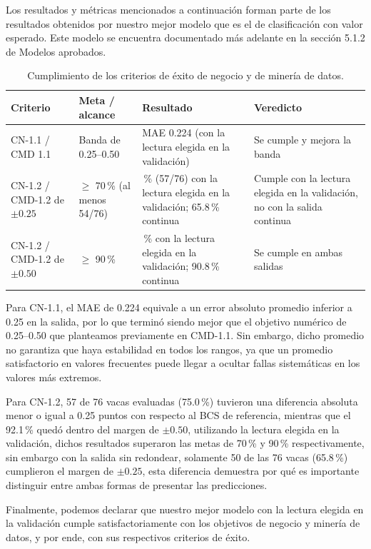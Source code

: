 Los resultados y métricas mencionados a continuación forman parte de los resultados obtenidos por nuestro mejor modelo que es el de clasificación con valor esperado. Este modelo se encuentra documentado más adelante en la sección 5.1.2 de Modelos aprobados.

\begin{table}[H]
  \centering
  \small
  \caption{Cumplimiento de los criterios de éxito de negocio y de minería de datos.}
  \label{tab:criterios}
  \begin{tabularx}{\textwidth}{>{\raggedright\arraybackslash}p{}>{\raggedright\arraybackslash}p{}>{\raggedright\arraybackslash}X>{\raggedright\arraybackslash}p{}}
    \toprule
    Criterio & Meta / alcance & Resultado & Veredicto \\
    \midrule
    CN-1.1 / CMD 1.1 & Banda de 0.25--0.50 & MAE 0.224 (con la lectura elegida en la validación) & Se cumple y mejora la banda \\
    \addlinespace
    CN-1.2 / CMD-1.2 de $\pm0.25$ & $\geq$ 70\,\% (al menos 54/76) & 75.0\,\% (57/76) con la lectura elegida en la validación; 65.8\,\% continua & Cumple con la lectura elegida en la validación, no con la salida continua \\
    \addlinespace
    CN-1.2 / CMD-1.2 de $\pm0.50$ & $\geq$ 90\,\% & 92.1\,\% con la lectura elegida en la validación; 90.8\,\% continua & Se cumple en ambas salidas \\
    \bottomrule
  \end{tabularx}
\end{table}

Para CN-1.1, el MAE de 0.224 equivale a un error absoluto promedio inferior a 0.25 en la salida, por lo que terminó siendo mejor que el objetivo numérico de 0.25--0.50 que planteamos previamente en CMD-1.1. Sin embargo, dicho promedio no garantiza que haya estabilidad en todos los rangos, ya que un promedio satisfactorio en valores frecuentes puede llegar a ocultar fallas sistemáticas en los valores más extremos.

Para CN-1.2, 57 de 76 vacas evaluadas (75.0\,\%) tuvieron una diferencia absoluta menor o igual a 0.25 puntos con respecto al BCS de referencia, mientras que el 92.1\,\% quedó dentro del margen de $\pm0.50$, utilizando la lectura elegida en la validación, dichos resultados superaron las metas de 70\,\% y 90\,\% respectivamente, sin embargo con la salida sin redondear, solamente 50 de las 76 vacas (65.8\,\%) cumplieron el margen de $\pm0.25$, esta diferencia demuestra por qué es importante distinguir entre ambas formas de presentar las predicciones.

Finalmente, podemos declarar que nuestro mejor modelo con la lectura elegida en la validación cumple satisfactoriamente con los objetivos de negocio y minería de datos, y por ende, con sus respectivos criterios de éxito.

